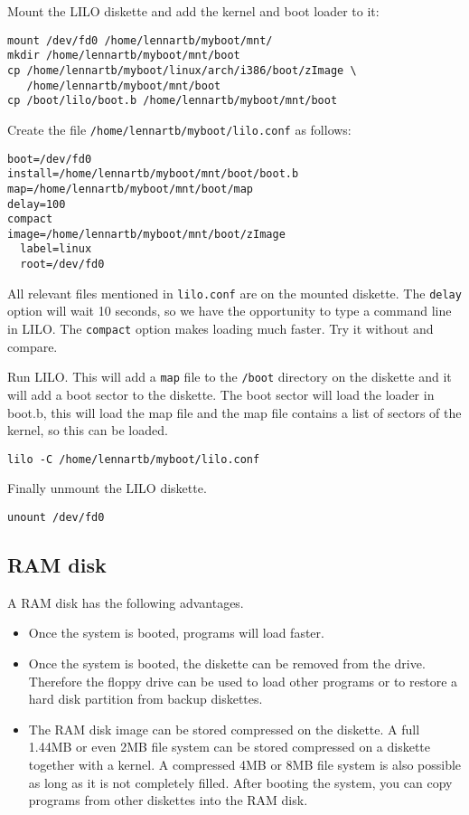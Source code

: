\documentclass[12pt,a4paper]{article}
\begin{document}
Mount the LILO diskette and add the kernel and boot loader to it:
\begin{verbatim}
mount /dev/fd0 /home/lennartb/myboot/mnt/
mkdir /home/lennartb/myboot/mnt/boot
cp /home/lennartb/myboot/linux/arch/i386/boot/zImage \
   /home/lennartb/myboot/mnt/boot
cp /boot/lilo/boot.b /home/lennartb/myboot/mnt/boot
\end{verbatim}

Create the file {\tt /home/lennartb/myboot/lilo.conf} as follows:
\begin{verbatim}
boot=/dev/fd0
install=/home/lennartb/myboot/mnt/boot/boot.b
map=/home/lennartb/myboot/mnt/boot/map
delay=100
compact
image=/home/lennartb/myboot/mnt/boot/zImage
  label=linux
  root=/dev/fd0
\end{verbatim}
All relevant files mentioned in {\tt lilo.conf}  are on the mounted diskette.
The {\tt delay} option will wait 10 seconds, so we have the
opportunity to type a command line in LILO. The {\tt compact} option
makes loading much faster. Try it without and compare.

Run LILO. This will add a {\tt map} file to the {\tt /boot} directory
on the diskette and it will add a boot sector to the diskette. The
boot sector will load the loader in boot.b, this will load the map
file and the map file contains a list of sectors of the kernel, so
this can be loaded.
\begin{verbatim}
lilo -C /home/lennartb/myboot/lilo.conf
\end{verbatim}

Finally unmount the LILO diskette.
\begin{verbatim}
unount /dev/fd0
\end{verbatim}

\subsection{RAM disk}

A RAM disk has the following advantages.
\begin{itemize}
\item Once the system is booted, programs will load faster.
\item Once the system is booted, the diskette can be removed from the
  drive. Therefore the floppy drive can be used to load other programs
  or to restore a hard disk partition from backup diskettes.
\item The RAM disk image can be stored compressed on the diskette. A
  full 1.44MB or even 2MB file system can be stored compressed on a
  diskette together with a kernel. A compressed 4MB or 8MB file system
  is also possible as long as it is not completely filled. After
  booting the system, you can copy programs from other diskettes into
  the RAM disk.
\end{itemize}
\end{document}
